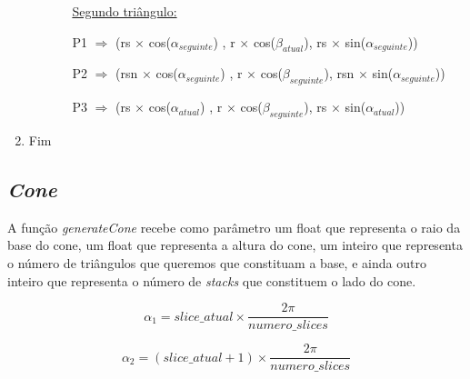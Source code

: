 \documentclass[a4paper]{article}
\begin{document}
\begin{enumerate}
\begin{enumerate}
\begin{enumerate}
      \underline{Segundo triângulo:}

      \vspace{0.5cm}

          \hspace{-0.25cm} P1 $\Rightarrow$ (rs $\times$ cos($\alpha_{seguinte}$) , r $\times$ cos($\beta_{atual}$), rs $\times$ sin($\alpha_{seguinte}$))

      \vspace{0.2cm}

          \hspace{-0.75cm} P2 $\Rightarrow$ (rsn $\times$ cos($\alpha_{seguinte}$) , r $\times$ cos($\beta_{seguinte}$), rsn $\times$ sin($\alpha_{seguinte}$))

      \vspace{0.2cm}

          \hspace{0.0cm} P3 $\Rightarrow$ (rs $\times$ cos($\alpha_{atual}$) , r $\times$ cos($\beta_{seguinte}$), rs $\times$ sin($\alpha_{atual}$))

      \vspace{0.2cm}

    \end{enumerate}

    \end{enumerate}

    \item Fim
    \end{enumerate}
    \rmfamily

\newpage

\subsection{\textit{Cone}}
\label{sec:cone}
A função \textit{generateCone} recebe como parâmetro um float que representa o raio da base do cone, um float que representa a altura do cone, um inteiro que representa o número de triângulos que queremos que constituam a base, e ainda outro inteiro que representa o número de \textit{stacks} que constituem o lado do cone.



\ttfamily
$$\alpha_{1} = slice\_atual \times \frac{2\pi}{numero\_slices} $$

\vspace{0.5cm}

$$\alpha_{2} = (slice\_atual+1) \times \frac{2\pi}{numero\_slices} $$

\vspace{0.5cm}
\end{document}
